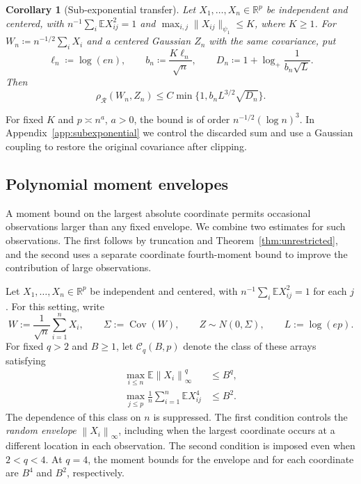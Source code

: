 \documentclass[11pt,letterpaper]{article}
\newtheorem{corollary}{Corollary}
\theoremstyle{remark}
\newcommand{\E}{\mathbb E}
\newcommand{\R}{\mathbb R}
\newcommand{\Cov}{\operatorname{Cov}}
\newcommand{\norm}[1]{\left\lVert#1\right\rVert}
\newcommand{\rh}{\rho_{\mathcal R}}
\begin{document}
\begin{corollary}[Sub-exponential transfer]\label{cor:subexponential}
Let \(X_1,\ldots,X_n\in\R^p\) be independent and centered, with
\(n^{-1}\sum_i\E X_{ij}^2=1\) and
\(\max_{i,j}\|X_{ij}\|_{\psi_1}\le K\), where \(K\ge1\).
For \(W_n\coloneqq n^{-1/2}\sum_iX_i\) and a centered Gaussian \(Z_n\)
with the same covariance, put
\[
 \ell_n\coloneqq \log(en),\qquad b_n\coloneqq \frac{K\ell_n}{\sqrt n},\qquad
 D_n\coloneqq 1+\log_+\frac1{b_n\sqrt L}.
\]
Then
\begin{equation}
 \rh(W_n,Z_n)\le C\min\{1,b_nL^{3/2}\sqrt{D_n}\}.
 \label{eq:subexponential}
\end{equation}

\end{corollary}

For fixed \(K\) and \(p\asymp n^a\), \(a>0\), the bound is of order
\(n^{-1/2}(\log n)^3\). In Appendix~\ref{app:subexponential} we
control the discarded sum and use a Gaussian coupling to restore
the original covariance after clipping.

\subsection{Polynomial moment envelopes}\label{sec:polynomial-main}

A moment bound on the largest absolute coordinate permits occasional
observations larger than any fixed envelope. We combine two estimates
for such observations. The first follows by truncation and
Theorem~\ref{thm:unrestricted}, and the second uses a separate
coordinate fourth-moment bound to improve the contribution of large
observations.

Let \(X_1,\ldots,X_n\in\R^p\) be independent and centered, with
\(n^{-1}\sum_i\E X_{ij}^2=1\) for each \(j\). For this setting, write
\begin{equation}
 W:=\frac1{\sqrt n}\sum_{i=1}^nX_i,\qquad
 \Sigma:=\Cov(W),\qquad Z\sim N(0,\Sigma),\qquad L:=\log(ep).
 \label{poly:setup}
\end{equation}
For fixed \(q>2\) and \(B\ge1\), let \(\mathcal C_q(B,p)\)
denote the class of these arrays satisfying
\begin{align}
 \max_{i\le n}\E\norm{X_i}_\infty^q&\le B^q,
 \label{poly:envelope}\\
 \max_{j\le p}\frac1n\sum_{i=1}^n\E X_{ij}^4&\le B^2.
 \label{poly:fourth}
\end{align}
The dependence of this class on \(n\) is suppressed.
The first condition controls the \emph{random envelope}
\(\norm{X_i}_\infty\), including when the largest coordinate occurs
at a different location in each observation. The second condition
is imposed even when \(2<q<4\). At \(q=4\), the moment bounds for
the envelope and for each coordinate are \(B^4\) and \(B^2\),
respectively.
\end{document}
